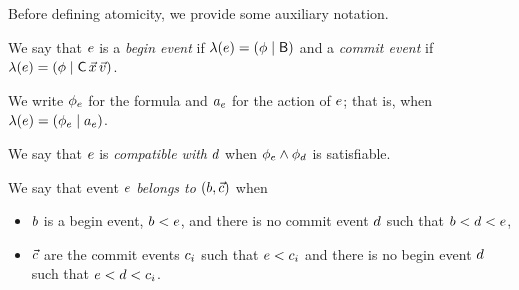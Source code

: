 Before defining atomicity, we provide some auxiliary notation.

We say that $e$ is a \emph{begin event} if
$\lambda(e)=(\phi\mid\mathsf{B})$ and a \emph{commit event} if
$\labelling(\aEv)=(\aForm\mid\DC{\vec\aLoc}{\vec\aVal})$.

We write $\phi_e$ for the formula and $a_e$ for the
action of $e$; that is, when $\lambda(e)=(\phi_e\mid a_e)$.

We say that $e$ is \emph{compatible with} $d$ when
$\phi_e\land\phi_d$ is satisfiable.

We say that  event $e$ \emph{belongs to} $(b,\vec{c})$ when
\begin{itemize}
\item $b$ is a begin event, $b<e$, and
  there is no commit event $d$ such that $b<d<e$,
\item $\vec{c}$ are the commit events $c_i$ such that $e<c_i$ and
  there is no begin event $d$ such that $e<d<c_i$.
\end{itemize}


